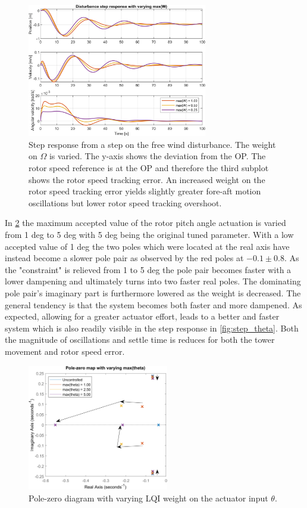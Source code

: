 \begin{figure}[ht]
	\centering
	\includegraphics[width=0.7\textwidth]{Graphics/LQI pole zero/103_step_W.png}
	\caption{Step response from a step on the free wind disturbance. The weight on $ \Omega $ is varied. The y-axis shows the deviation from the OP. The rotor speed reference is at the OP and therefore the third subplot shows the rotor speed tracking error. An increased weight on the rotor speed tracking error yields slightly greater fore-aft motion oscillations but lower rotor speed tracking overshoot.}
	\label{fig:step_W}
\end{figure}

In \cref{fig:pzmap_theta} the maximum accepted value of the rotor pitch angle actuation is varied from 1 deg to 5 deg with 5 deg being the original tuned parameter. With a low accepted value of 1 deg the two poles which were located at the real axis have instead become a slower pole pair as observed by the red poles at $ -0.1 \pm0.8 $. As the "constraint" is relieved from 1 to 5 deg the pole pair becomes faster with a lower dampening and ultimately turns into two faster real poles. The dominating pole pair's imaginary part is furthermore lowered as the weight is decreased. The general tendency is that the system becomes both faster and more dampened. As expected, allowing for a greater actuator effort, leads to a better and faster system which is also readily visible in the step response in \cref{fig:step_theta}. Both the magnitude of oscillations and settle time is reduces for both the tower movement and rotor speed error.
\begin{figure}[ht]
	\centering
	\includegraphics[width=0.55\textwidth]{Graphics/LQI pole zero/05_pzmap_theta.png}
	\caption{Pole-zero diagram with varying LQI weight on the actuator input $ \theta $.}
	\label{fig:pzmap_theta}
\end{figure}

